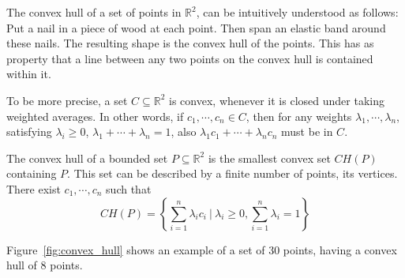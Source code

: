 \iffalse

The convex hull of a set of points in $\mathbb{R}^2$, can be intuitively 
understood as follows: Put a nail in a piece of wood at each point. Then span 
an elastic band around these nails. The resulting shape is the convex hull of 
the points. This has as property that a line between any two points on the 
convex hull is contained within it.

To be more precise, a set $C \subseteq \mathbb{R}^2$ is convex, whenever
it is closed under taking weighted averages. In other words,
if $c_1, \cdots, c_n \in C$, then for any weights 
$\lambda_1, \cdots, \lambda_n$, satisfying $\lambda_i \geq 0$, 
$\lambda_1 + \cdots + \lambda_n = 1$, also
$\lambda_1 c_1 + \cdots + \lambda_n c_n$ must be in $C$.

The convex hull of a bounded set $P \subseteq \mathbb{R}^2$ is the smallest 
convex set $CH(P)$ containing $P$. This set can be described by a finite 
number of points, its vertices. There exist $c_1, \cdots, c_n$ such that
$$CH(P) = \left\{\sum_{i = 1}^n \lambda_i c_i \ | \ 
                      \lambda_i \geq 0, \sum_{i = 1}^n \lambda_i = 1\right\}$$

Figure~\ref{fig:convex_hull} shows an example of a set of $30$ points, having 
a convex hull of $8$ points.

